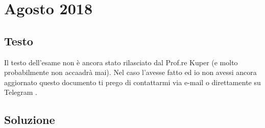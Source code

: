 \section{Agosto 2018}

\subsection*{Testo}

Il testo dell'esame non è ancora stato rilasciato dal Prof.re Kuper (e molto probabilmente non accaadrà mai). %
{\color{burgundy} Nel caso l'avesse fatto ed io non avessi ancora aggiornato questo documento ti prego di contattarmi via e-mail \href{mailto:emanuele.nardi@studenti.unitn.it}{\ExternalLink} o direttamente su Telegram \href{https://t.me/emanuelenardi}{\ExternalLink}.}

\subsection*{Soluzione}


